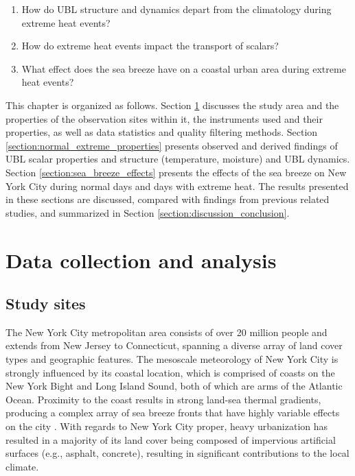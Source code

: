 \begin{enumerate}
  \item How do UBL structure and dynamics depart from the climatology during extreme heat events?
  \item How do extreme heat events impact the transport of scalars?
  \item What effect does the sea breeze have on a coastal urban area during extreme heat events?
\end{enumerate}

This chapter is organized as follows. Section \ref{section:data_methods} discusses the study area and the properties of the observation sites within it, the instruments used and their properties, as well as data statistics and quality filtering methods. Section \ref{section:normal_extreme_properties} presents observed and derived findings of UBL scalar properties and structure (temperature, moisture) and UBL dynamics. Section \ref{section:sea_breeze_effects} presents the effects of the sea breeze on New York City during normal days and days with extreme heat. The results presented in these sections are discussed, compared with findings from previous related studies, and summarized in Section \ref{section:discussion_conclusion}.


\section{Data collection and analysis} \label{section:data_methods}

\subsection{Study sites} 

The New York City metropolitan area consists of over 20 million people \citep{bureau2021} and extends from New Jersey to Connecticut, spanning a diverse array of land cover types and geographic features. The mesoscale meteorology of New York City is strongly influenced by its coastal location, which is comprised of coasts on the New York Bight and Long Island Sound, both of which are arms of the Atlantic Ocean. Proximity to the coast results in strong land-sea thermal gradients, producing a complex array of sea breeze fronts that have highly variable effects on the city \citep{bornstein1981, gedzelman2003}. With regards to New York City proper, heavy urbanization has resulted in a majority of its land cover being composed of impervious artificial surfaces (e.g., asphalt, concrete), resulting in significant contributions to the local climate.

